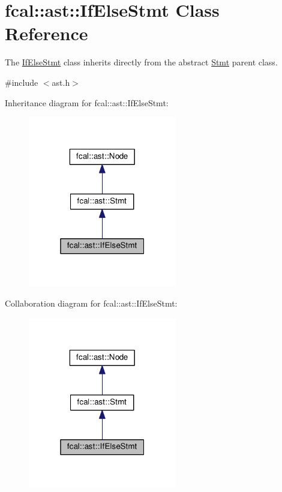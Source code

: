 \hypertarget{classfcal_1_1ast_1_1IfElseStmt}{}\section{fcal\+:\+:ast\+:\+:If\+Else\+Stmt Class Reference}
\label{classfcal_1_1ast_1_1IfElseStmt}


The \hyperlink{classfcal_1_1ast_1_1IfElseStmt}{If\+Else\+Stmt} class inherits directly from the abstract \hyperlink{classfcal_1_1ast_1_1Stmt}{Stmt} parent class.  




{\ttfamily \#include $<$ast.\+h$>$}



Inheritance diagram for fcal\+:\+:ast\+:\+:If\+Else\+Stmt\+:\nopagebreak
\begin{figure}[H]
\begin{center}
\leavevmode
\includegraphics[width=184pt]{classfcal_1_1ast_1_1IfElseStmt__inherit__graph}
\end{center}
\end{figure}


Collaboration diagram for fcal\+:\+:ast\+:\+:If\+Else\+Stmt\+:\nopagebreak
\begin{figure}[H]
\begin{center}
\leavevmode
\includegraphics[width=184pt]{classfcal_1_1ast_1_1IfElseStmt__coll__graph}
\end{center}
\end{figure}
